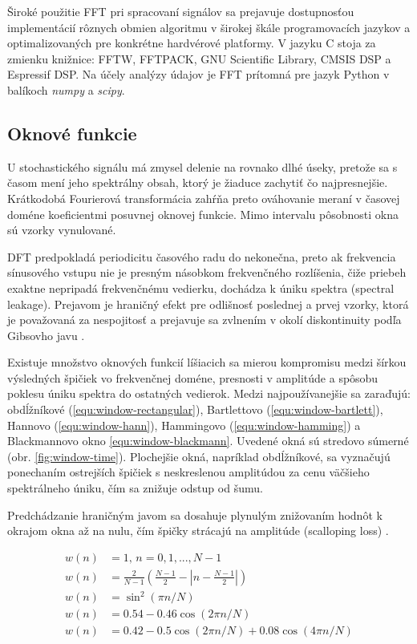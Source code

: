 Široké použitie FFT pri spracovaní signálov sa prejavuje dostupnosťou implementácií rôznych obmien algoritmu
v širokej škále programovacích jazykov a optimalizovaných pre konkrétne hardvérové platformy. V jazyku C stoja
za zmienku knižnice: FFTW, FFTPACK, GNU Scientific Library, CMSIS DSP a Espressif DSP. Na účely analýzy údajov je FFT
prítomná pre jazyk Python v balíkoch \emph{numpy} a \emph{scipy}.

\subsection{Oknové funkcie}
U stochastického signálu má zmysel delenie na rovnako dlhé úseky, pretože sa s časom mení jeho spektrálny obsah, ktorý
je žiaduce zachytiť čo najpresnejšie. Krátkodobá Fourierová transformácia zahŕňa preto ováhovanie meraní
v časovej doméne koeficientmi posuvnej oknovej funkcie. Mimo intervalu pôsobnosti okna sú vzorky vynulované.

DFT predpokladá periodicitu časového radu do nekonečna, preto ak frekvencia sínusového vstupu nie je presným násobkom
frekvenčného rozlíšenia, čiže priebeh exaktne nepripadá frekvenčnému vedierku, dochádza k úniku spektra (spectral leakage).
Prejavom je hraničný efekt pre odlišnosť poslednej a prvej vzorky, ktorá je považovaná za nespojitosť a prejavuje
sa zvlnením v okolí diskontinuity podľa Gibsovho javu \cite{understanding-dsp}.

Existuje množstvo oknových funkcií líšiacich sa mierou kompromisu medzi šírkou výsledných špičiek vo frekvenčnej doméne,
presnosti v amplitúde a spôsobu poklesu úniku spektra do ostatných vedierok. Medzi najpoužívanejšie sa zaraďujú: obdĺžníkové
(\ref{equ:window-rectangular}), Bartlettovo (\ref{equ:window-bartlett}), Hannovo (\ref{equ:window-hann}), Hammingovo
(\ref{equ:window-hamming}) a Blackmannovo okno \ref{equ:window-blackmann}. Uvedené okná sú stredovo súmerné
(obr. \ref{fig:window-time}). Plochejšie okná, napríklad obdĺžníkové, sa vyznačujú ponechaním ostrejších špičiek
s neskreslenou amplitúdou za cenu väčšieho spektrálneho úniku, čím sa znižuje odstup od šumu.

Predchádzanie hraničným javom sa dosahuje plynulým
znižovaním hodnôt k okrajom okna až na nulu, čím špičky strácajú na amplitúde (scalloping loss) \cite{spectral-density-estimation}.
\begin{ceqn}\begin{align}
w(n) &= 1,\, n = 0, 1, ..., N - 1 \label{equ:window-rectangular} \\
w(n) &= \frac{2}{N - 1}\left(\frac{N - 1}{2} - \left|n - \frac{N - 1}{2} \right|\right) \label{equ:window-bartlett}  \\
w(n) &= \sin^2(\pi n / N)  \label{equ:window-hann} \\
w(n) &= 0.54 - 0.46\cos(2\pi n / N) \label{equ:window-hamming} \\
w(n) &= 0.42 - 0.5\cos(2\pi n / N) + 0.08\cos(4\pi n / N)\label{equ:window-blackmann}
\end{align}\end{ceqn}

